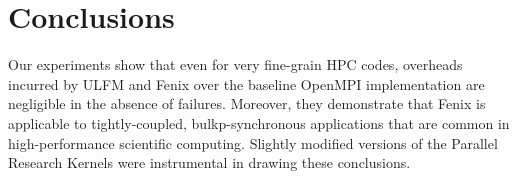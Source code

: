 \section{Conclusions}
Our experiments show that even for very fine-grain HPC codes, overheads
incurred by ULFM and Fenix over the baseline OpenMPI implementation
are negligible in the absence of failures.
Moreover, they demonstrate that Fenix is applicable to tightly-coupled,
bulkp-synchronous applications that are common in high-performance
scientific computing.
Slightly modified versions of the Parallel Research Kernels were
instrumental in drawing these conclusions.
